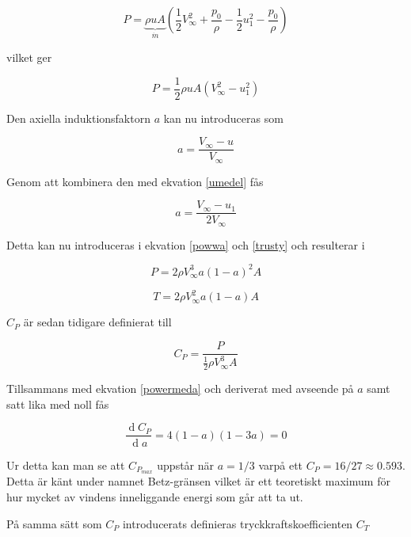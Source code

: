 \begin{equation*}
P =  \underbrace{\rho u A}_{\dot{m}} \left(\frac{1}{2} V^2_{\infty} + \frac{p_0}{\rho} - \frac{1}{2} u^2_1 - \frac{p_0}{\rho}\right)
\end{equation*}

vilket ger

\begin{equation}\label{powwa}
P =  \frac{1}{2}\rho u A (V^2_{\infty} - u_1^2)
\end{equation}

Den axiella induktionsfaktorn $a$ kan nu introduceras som

\begin{equation}
a = \frac{V_{\infty} - u}{V_{\infty}}
\end{equation}

Genom att kombinera den med ekvation \ref{umedel} fås

\begin{equation}\label{adef}
a = \frac{V_{\infty} - u_1}{2 V_{\infty}}
\end{equation}

Detta kan nu introduceras i ekvation \ref{powwa} och \ref{trusty} och resulterar i

\begin{equation}\label{powermeda}
P = 2 \rho V^3_{\infty} a (1 - a)^2 A
\end{equation}

\begin{equation}
T = 2 \rho V^2_{\infty} a (1 - a) A
\end{equation}

$C_P$ är sedan tidigare definierat till 

\begin{equation}
C_P = \frac{P}{\frac{1}{2} \rho V^3_{\infty} A}
\end{equation}

Tillsammans med ekvation \ref{powermeda} och deriverat med avseende på $a$ samt satt lika med noll fås 

\begin{equation}
\frac{\operatorname{d}\!C_P}{\operatorname{d}\!a} = 4(1 - a)(1 - 3a) = 0
\end{equation}

Ur detta kan man se att $C_{P_{max}}$ uppstår när $a = 1/3$ varpå ett $C_P = 16/27 \approx 0.593$. Detta är känt under namnet Betz-gränsen vilket är ett teoretiskt maximum för hur mycket av vindens inneliggande energi som går att ta ut.

På samma sätt som $C_P$ introducerats definieras tryckkraftskoefficienten $C_T$

